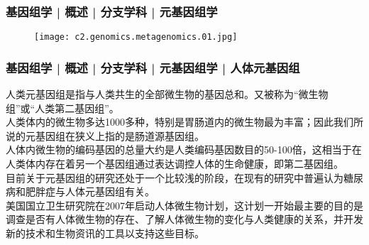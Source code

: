 \begin{frame}
  \frametitle{基因组学 | 概述 | 分支学科 | 元基因组学}
  \begin{figure}
    \centering
    \texttt{[image: c2.genomics.metagenomics.01.jpg]}
  \end{figure}
\end{frame}

\begin{frame}
  \frametitle{基因组学 | 概述 | 分支学科 | 元基因组学 | 人体元基因组}
人类元基因组是指与人类共生的全部微生物的基因总和。又被称为“微生物组”或“人类第二基因组”。\\
\vspace{1em}
人类体内的微生物多达1000多种，特别是胃肠道内的微生物最为丰富；因此我们所说的元基因组在狭义上指的是肠道源基因组。\\
\vspace{1em}
人体内微生物的编码基因的总量大约是人类编码基因数目的50-100倍，这相当于在人类体内存在着另一个基因组通过表达调控人体的生命健康，即第二基因组。\\
\vspace{1em}
目前关于元基因组的研究还处于一个比较浅的阶段，在现有的研究中普遍认为糖尿病和肥胖症与人体元基因组有关。\\
\vspace{1em}
美国国立卫生研究院在2007年启动人体微生物计划，这计划一开始最主要的目的是调查是否有人体微生物的存在、了解人体微生物的变化与人类健康的关系，并开发新的技术和生物资讯的工具以支持这些目标。
\end{frame}

